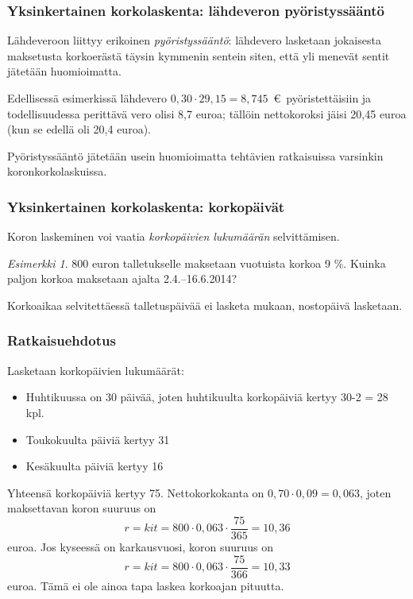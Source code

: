 \documentclass{article}\usepackage[]{graphicx}\usepackage[]{color}
\theoremstyle{remark}
\newtheorem{esim}{Esimerkki}
\begin{document}
\begin{frame}
    \frametitle{Yksinkertainen korkolaskenta: lähdeveron pyöristyssääntö}
    
    \pause
    Lähdeveroon liittyy erikoinen \emph{pyöristyssääntö}:\pause 
    lähdevero lasketaan jokaisesta maksetusta korkoerästä täysin kymmenin sentein siten,
    että yli menevät sentit jätetään huomioimatta.
    \pause
    \begin{block}{}
        Edellisessä esimerkissä lähdevero \(0,30\cdot29{,}15 = 8{,}745\)~\euro\ pyöristettäisiin ja todellisuudessa perittävä vero olisi 8{,}7 euroa; tällöin nettokoroksi jäisi 20{,}45 euroa (kun se edellä oli 20{,}4 euroa).
    \end{block}
    \pause
    Pyöristyssääntö jätetään usein huomioimatta tehtävien ratkaisuissa varsinkin koronkorkolaskuissa.
\end{frame}

\begin{frame}
    \frametitle{Yksinkertainen korkolaskenta: korkopäivät}
    \pause
    Koron laskeminen voi vaatia \emph{korkopäivien lukumäärän} selvittämisen.
    \pause
    \begin{esim}
        800 euron talletukselle maksetaan vuotuista korkoa 9 \%. Kuinka paljon korkoa maksetaan ajalta 2.4.--16.6.2014?
    \end{esim}
    \pause
    Korkoaikaa selvitettäessä talletuspäivää ei lasketa mukaan, nostopäivä lasketaan.
\end{frame}

\begin{frame}
    \frametitle{Ratkaisuehdotus}
    Lasketaan korkopäivien lukumäärät:\pause
    \begin{itemize}
        \item Huhtikuussa on 30 päivää, joten huhtikuulta korkopäiviä kertyy 30-2 = 28 kpl.\pause
        \item Toukokuulta päiviä kertyy 31\pause
        \item Kesäkuulta päiviä kertyy 16
    \end{itemize}
    Yhteensä korkopäiviä kertyy 75. Nettokorkokanta on \(0,70\cdot0,09 = 0,063\), joten maksettavan koron suuruus on\pause
    \[
        r = kit = 800\cdot 0,063\cdot \frac{75}{365} = 10,36
    \]
    euroa. \pause Jos kyseessä on karkausvuosi, koron suuruus on
    \[
        r = kit = 800\cdot 0,063\cdot \frac{75}{366} = 10,33
    \]
    euroa. \pause Tämä ei ole ainoa tapa laskea korkoajan pituutta.
\end{frame}
\end{document}

